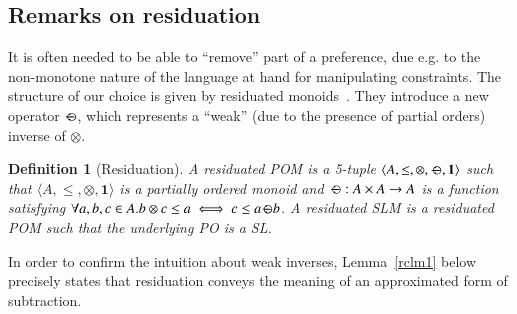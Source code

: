 \documentclass[preprint,12pt]{elsarticle}
\newtheorem{definition}{Definition}
\def\monid{{\mathbf 0}}
\def\monop{\otimes}
\def\odiv{\, {\ominus\hspace{-7.7pt} \div} \,}
\def\monid{\mathbf{1}}
\begin{document}
%
%
%

\subsection{Remarks on residuation}\label{sec:ror}
It is often needed to be able to ``remove'' part of a preference, due e.g. 
to the non-monotone nature of the language at hand
for manipulating constraints. 
%
The structure of our choice is given by residuated monoids~\cite{golanShort}. 
%
They introduce a new operator $\odiv$, which represents a ``weak'' (due to the presence of partial orders) inverse of $\otimes$.

\begin{definition}[Residuation]\label{def:repo}
	A residuated POM is a 5-tuple $\langle A, \leq, \monop, \odiv, \monid \rangle$ such that
	$\langle A, \leq, \monop, \monid \rangle$ is a partially ordered monoid and
	$\odiv: A \times A \rightarrow A$ is a function satisfying $\forall a, b, c \in A. b \monop c \leq a \iff c \leq a \odiv b$. A residuated SLM is a
	residuated POM such that the underlying PO is a SL.
\end{definition}

%

In order to confirm the intuition about weak inverses,
Lemma~\ref{rclm1} below precisely states that residuation conveys the meaning of 
an approximated form of subtraction.
%
\end{document}
